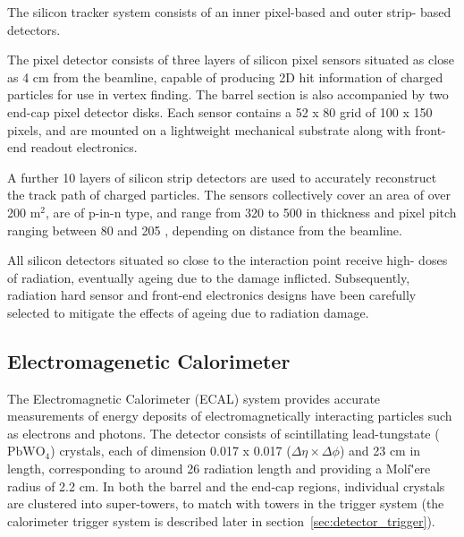 The silicon tracker system consists of an inner pixel-based and outer strip-
based detectors.

The pixel detector consists of three layers of silicon pixel sensors situated 
as close as 4 cm from the beamline, capable 
of producing 2D hit information of charged particles for use in vertex 
finding. The barrel section is also accompanied by two end-cap pixel detector 
disks. Each sensor contains a 52 x 80 grid of 100 \microm x 150 \microm pixels, 
and are mounted on a lightweight mechanical substrate along with front-end readout 
electronics.

A further 10 layers of silicon strip detectors are used to accurately 
reconstruct the track path of charged particles. The sensors collectively cover 
an area of over 200 $\text{m}^2$, are of p-in-n type, and range from 320 \microm
to 500 \microm in thickness and pixel pitch ranging between 80 \microm and 
205 \microm, depending on distance from the beamline.

All silicon detectors situated so close to the interaction point receive high-
doses of radiation, eventually ageing due to the damage inflicted. Subsequently, 
radiation hard sensor and front-end electronics designs have been carefully 
selected to mitigate the effects of ageing due to radiation damage.

\subsection{Electromagenetic Calorimeter}



The Electromagnetic Calorimeter (ECAL) system provides accurate measurements of 
energy deposits of electromagnetically interacting particles such as 
electrons and photons. The detector consists of scintillating lead-tungstate
($\text{PbWO}_4$) crystals, each of dimension 0.017 x 0.017 ($\Delta \eta \times
\Delta \phi$) and 23 cm in length, corresponding to around 26 radiation length 
and providing a Moli\`'{e}re radius of 2.2 cm. In both the barrel and the
end-cap regions, individual crystals are clustered
into super-towers, to match with towers in the trigger system
(the calorimeter trigger system is described later in
section~\ref{sec:detector_trigger}).

